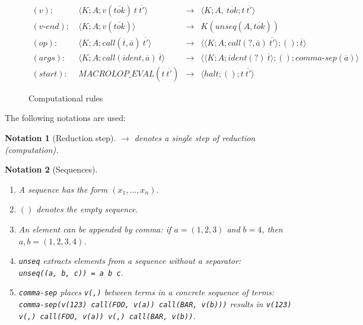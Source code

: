 \documentclass[12pt]{article}
\theoremstyle{break}
\newtheorem{notation}{Notation}
\begin{document}
\begin{figure}[H]
    \caption{Computational rules}

    \begin{align*}
        (v): \ & \langle K; A; v(\overline{tok}) \ t \ \overline{t'} \rangle & \to &
            \langle K; A, \ \overline{tok}; t \ \overline{t'} \rangle \\
        (v\mbox{-}end): \ & \langle K; A; v(\overline{tok}) \rangle & \to &
            K(unseq(A, \overline{tok})) \\
        (op): \ & \langle K; A; call(\overline{t}, \overline{a}) \ \overline{t'} \rangle & \to &
            \langle \langle K; A; call(?, \overline{a}) \ \overline{t'} \rangle; (); \overline{t} \rangle \\
        (args): \ & \langle K; A; call(ident, \overline{a}) \ \overline{t} \rangle & \to
            & \langle \langle K; A; ident(?) \ \overline{t} \rangle; (); comma\mbox{-}sep(\overline{a}) \rangle \\
        (start): \ & MACROLOP\_EVAL(t \ \overline{t'}) & \to &
            \langle halt; (); t \ \overline{t'} \rangle
    \end{align*}
\end{figure}

The following notations are used:

\begin{notation}[Reduction step]
    $\to$ denotes a single step of reduction (computation).
\end{notation}

\begin{notation}[Sequences]
    \label{SequencesNotation}
    \begin{enumerate}
        \item A sequence has the form $(x_1, \ldots, x_n)$.
        \item $()$ denotes the empty sequence.
        \item An element can be appended by comma: if $a = (1, 2, 3)$ and $b = 4$, then $a, b = (1, 2, 3, 4)$.
        \item \texttt{unseq} extracts elements from a sequence without a separator: \\
        \texttt{unseq((a, b, c)) = a b c}.
        \item \texttt{comma-sep} places \texttt{v(,)} between terms in a concrete sequence of terms:\\
        \texttt{comma-sep(v(123) call(FOO, v(a)) call(BAR, v(b)))} results in
        \texttt{v(123) v(,) call(FOO, v(a)) v(,) call(BAR, v(b))}.
    \end{enumerate}
\end{notation}
\end{document}
